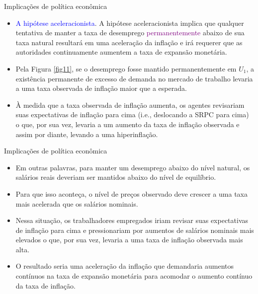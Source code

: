 \documentclass[10pt]{beamer}
\begin{document}
\begin{frame}{Implicações de política econômica}
    \begin{itemize}
        \item \textcolor{blue}{A hipótese aceleracionista}. A hipótese aceleracionista implica que qualquer tentativa de manter a taxa de desemprego \textcolor{purple}{permanentemente} abaixo de sua taxa natural resultará em uma aceleração da inflação e irá requerer que as autoridades continuamente aumentem a taxa de expansão monetária.
        \bigskip
        \item Pela Figura \ref{fig11}, se o desemprego fosse mantido permanentemente em $U_1$, a existência permanente de excesso de demanda no mercado de trabalho levaria a uma taxa observada de inflação maior que a esperada.
        \bigskip
        \item À medida que a taxa observada de inflação aumenta, os agentes revisariam suas expectativas de inflação para cima (i.e., deslocando a SRPC para cima) o que, por sua vez, levaria a um aumento da taxa de inflação observada e assim por diante, levando a uma hiperinflação.
    \end{itemize}    
\end{frame}

\begin{frame}{Implicações de política econômica}
    \begin{itemize}
        \item Em outras palavras, para manter um desemprego abaixo do nível natural, os salários reais deveriam ser mantidos abaixo do nível de equilíbrio.
        \bigskip
        \item Para que isso aconteça, o nível de preços observado deve crescer a uma taxa mais acelerada que os salários nominais.
        \bigskip
        \item Nessa situação, os trabalhadores empregados iriam revisar suas expectativas de inflação para cima e pressionariam por aumentos de salários nominais mais elevados o que, por sua vez, levaria a uma taxa de inflação observada mais alta.
        \bigskip
        \item O resultado seria uma aceleração da inflação que demandaria aumentos contínuos na taxa de expansão monetária para acomodar o aumento contínuo da taxa de inflação.
    \end{itemize}    
\end{frame}
\end{document}
